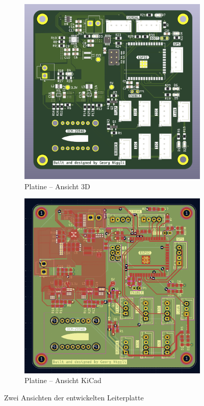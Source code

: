 \begin{figure}[H]
    \centering
     \begin{subfigure}[b]{0.38\linewidth}
        \centering
        \includegraphics[width=\linewidth]{assets/pcb_2.png}
        \caption{Platine – Ansicht 3D}
        \label{fig:pcb_2}
    \end{subfigure}
    \hfill
      \begin{subfigure}[b]{0.38\linewidth}
        \centering
        \includegraphics[width=\linewidth]{assets/pcb_1.png}
        \caption{Platine – Ansicht KiCad}
        \label{fig:pcb_1}
    \end{subfigure}
    \caption{Zwei Ansichten der entwickelten Leiterplatte}
    \label{fig:pcb_views}
\end{figure}


